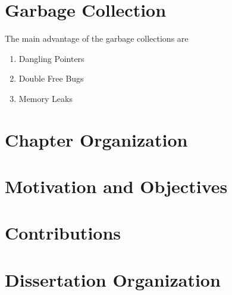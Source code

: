 

\section{Garbage Collection}

The main advantage of the garbage collections are 
\begin{enumerate}
	\item Dangling Pointers
	\item Double Free Bugs
	\item Memory Leaks
\end{enumerate}

\section{Chapter Organization}
\section{Motivation and Objectives}
\section{Contributions}
\section{Dissertation Organization}